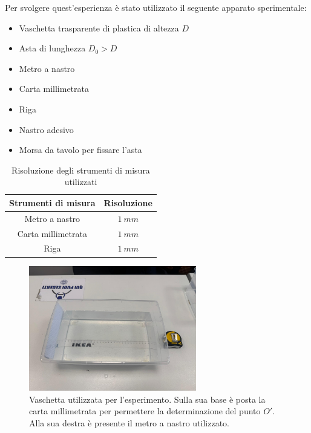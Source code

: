 Per svolgere quest'esperienza è stato utilizzato il seguente apparato sperimentale:
\begin{itemize}
	\item Vaschetta trasparente di plastica di altezza $D$
	\item Asta di lunghezza $D_0>D$
	\item Metro a nastro
	\item Carta millimetrata
	\item Riga
	\item Nastro adesivo
	\item Morsa da tavolo per fissare l'asta 
\end{itemize}


\begin{table}[H]
	\centering
	\begin{tabular}{|c|c|}
		\hline
		\textbf{Strumenti di misura} & \textbf{Risoluzione} \\
		\hline
		Metro a nastro & $1\ mm$ \\
		Carta millimetrata & $1\ mm$ \\
		Riga & $1\ mm$ \\
		\hline
	\end{tabular}
	\caption{Risoluzione degli strumenti di misura utilizzati}
	\label{tab:}
\end{table}


\begin{figure}[H]
	\centering
	\includegraphics[width=0.65\textwidth]{./figures/vaschettaemetro}
	\caption{Vaschetta utilizzata per l'esperimento. Sulla sua base è posta la carta millimetrata per permettere la determinazione del punto $O'$. Alla sua destra è presente il metro a nastro utilizzato.}
\end{figure}

